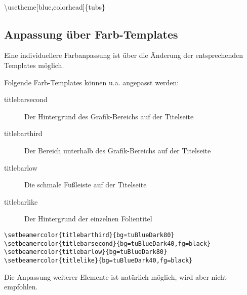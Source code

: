 \begin{center}
\begin{minipage}{0.49\textwidth}
\end{minipage}
\begin{minipage}{0.49\textwidth}
\end{minipage}\medskip\\
{\ttfamily%
  \textbackslash usetheme[blue,colorhead]\{tubs\}}
\end{center}

\clearpage
\subsection{Anpassung über Farb-Templates}

Eine individuellere Farbanpassung ist über die Änderung der entsprechenden
Templates möglich.

Folgende Farb-Templates können u.a. angepasst werden:
\begin{description}
  \item[\color{tuRed100}\ttfamily titlebarsecond]
    Der Hintergrund des Grafik-Bereichs auf der Titelseite
  \item[\color{tuRed100}\ttfamily titlebarthird]
    Der Bereich unterhalb des Grafik-Bereichs auf der Titelseite
  \item[\color{tuRed100}\ttfamily titlebarlow]
    Die schmale Fußleiste auf der Titelseite
  \item[\color{tuRed100}\ttfamily titlebarlike]
    Der Hintergrund der einzelnen Folientitel
\end{description}

\example

\begin{lstlisting}
\setbeamercolor{titlebarthird}{bg=tuBlueDark80}
\setbeamercolor{titlebarsecond}{bg=tuBlueDark40,fg=black}
\setbeamercolor{titlebarlow}{bg=tuBlueDark80}
\setbeamercolor{titlelike}{bg=tuBlueDark40,fg=black}
\end{lstlisting}

Die Anpassung weiterer Elemente ist natürlich möglich,
wird aber nicht empfohlen.

% 
% 

